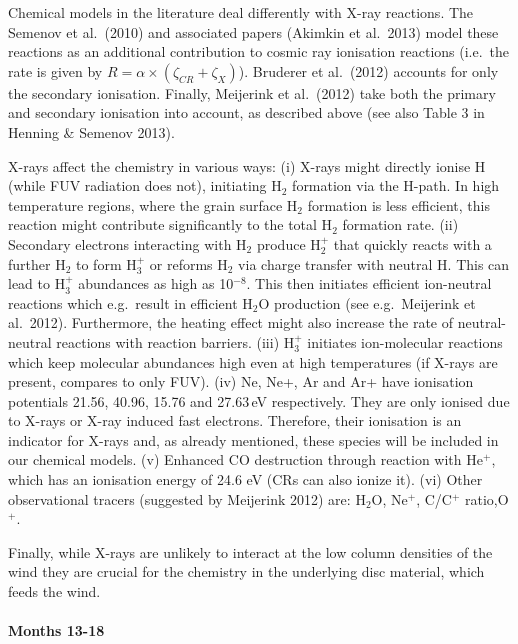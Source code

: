 \documentclass[10pt,fleqn,twoside]{article}
\begin{document}
Chemical models in the literature deal differently with X-ray reactions. The Semenov et al.\ (2010) and associated papers (Akimkin et al.\ 2013) model these reactions as an additional contribution to cosmic ray ionisation reactions (i.e.\ the rate is given by $R = \alpha \times (\zeta_{CR} + \zeta_X)$). Bruderer et al.\ (2012) accounts for only the secondary ionisation. Finally, Meijerink et al.\ (2012) take both the primary and secondary ionisation into account, as described above (see also Table 3 in Henning \& Semenov 2013).

X-rays affect the chemistry in various ways: (i) X-rays might directly ionise H (while FUV radiation does not), initiating H$_2$ formation via the H-path. In high temperature regions, where the grain surface H$_2$ formation is less efficient, this reaction might contribute significantly to the total H$_2$ formation rate. (ii) Secondary electrons interacting with H$_2$ produce H$_2^+$ that quickly reacts with a further H$_2$ to form H$_3^+$ or reforms H$_2$ via charge transfer with neutral H. This can lead to H$_3^+$ abundances as high as 10$^{-8}$. This then initiates efficient ion-neutral reactions which e.g.\ result in efficient H$_2$O production (see e.g.\ Meijerink et al.\ 2012). Furthermore, the heating effect might also increase the rate of neutral-neutral reactions with reaction barriers. (iii) H$_3^+$ initiates ion-molecular reactions which keep molecular abundances high even at high temperatures (if X-rays are present, compares to only FUV). (iv)
Ne, Ne+, Ar and Ar+ have ionisation potentials 21.56, 40.96, 15.76 and 27.63\,eV respectively. They are only ionised due to X-rays or X-ray induced fast electrons. Therefore, their ionisation is an indicator for X-rays and, as already mentioned, these species will be included in our chemical models. (v) Enhanced CO destruction through reaction with He$^+$, which has an ionisation energy of 24.6 eV (CRs can also ionize it). (vi) Other observational tracers (suggested by Meijerink 2012) are: H$_2$O, Ne$^+$, C/C$^+$ ratio,O$^+$.

Finally, while X-rays are unlikely to interact at the low column densities of the wind they are crucial for the chemistry in the underlying disc material, which feeds the wind. 

\paragraph{ Months 13-18}
\end{document}
